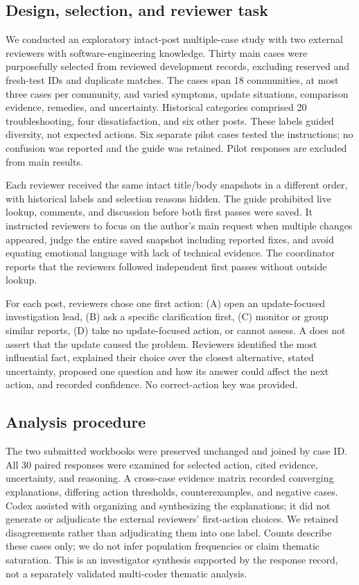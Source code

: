 \documentclass[conference,letterpaper]{IEEEtran}
\begin{document}
\subsection{Design, selection, and reviewer task}
We conducted an exploratory intact-post multiple-case study with two external reviewers with software-engineering knowledge. Thirty main cases were purposefully selected from reviewed development records, excluding reserved and fresh-test IDs and duplicate matches. The cases span 18 communities, at most three cases per community, and varied symptoms, update situations, comparison evidence, remedies, and uncertainty. Historical categories comprised 20 troubleshooting, four dissatisfaction, and six other posts. These labels guided diversity, not expected actions. Six separate pilot cases tested the instructions; no confusion was reported and the guide was retained. Pilot responses are excluded from main results.

Each reviewer received the same intact title/body snapshots in a different order, with historical labels and selection reasons hidden. The guide prohibited live lookup, comments, and discussion before both first passes were saved. It instructed reviewers to focus on the author's main request when multiple changes appeared, judge the entire saved snapshot including reported fixes, and avoid equating emotional language with lack of technical evidence. The coordinator reports that the reviewers followed independent first passes without outside lookup.

For each post, reviewers chose one first action: (A) open an update-focused investigation lead, (B) ask a specific clarification first, (C) monitor or group similar reports, (D) take no update-focused action, or cannot assess. A does not assert that the update caused the problem. Reviewers identified the most influential fact, explained their choice over the closest alternative, stated uncertainty, proposed one question and how its answer could affect the next action, and recorded confidence. No correct-action key was provided.

\subsection{Analysis procedure}
The two submitted workbooks were preserved unchanged and joined by case ID. All 30 paired responses were examined for selected action, cited evidence, uncertainty, and reasoning. A cross-case evidence matrix recorded converging explanations, differing action thresholds, counterexamples, and negative cases. Codex assisted with organizing and synthesizing the explanations; it did not generate or adjudicate the external reviewers' first-action choices. We retained disagreements rather than adjudicating them into one label. Counts describe these cases only; we do not infer population frequencies or claim thematic saturation. This is an investigator synthesis supported by the response record, not a separately validated multi-coder thematic analysis.
\end{document}
